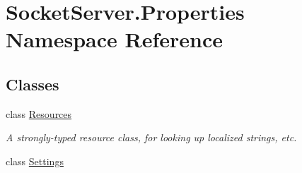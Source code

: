 \hypertarget{namespace_socket_server_1_1_properties}{}\section{Socket\+Server.\+Properties Namespace Reference}
\label{namespace_socket_server_1_1_properties}
\subsection*{Classes}
\begin{DoxyCompactItemize}
\item 
class \hyperlink{class_socket_server_1_1_properties_1_1_resources}{Resources}
\begin{DoxyCompactList}\small\item\em A strongly-\/typed resource class, for looking up localized strings, etc. \end{DoxyCompactList}\item 
class \hyperlink{class_socket_server_1_1_properties_1_1_settings}{Settings}
\end{DoxyCompactItemize}
